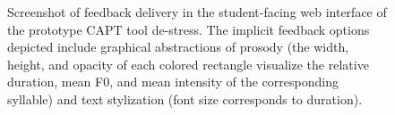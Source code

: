 \documentclass[11pt,a4paper,onecolumn]{article}
\begin{document}
		\begin{figure}[p]
		\caption{Screenshot of feedback delivery in the student-facing web interface of the prototype CAPT tool de-stress.
		The implicit feedback options depicted include graphical abstractions of prosody (the width, height, and opacity of each colored rectangle visualize the relative duration, mean F0, and mean intensity of the corresponding syllable)
		and text stylization (font size corresponds to duration).
		}
		\label{fig:interface}
		\end{figure}
		
\end{document}
